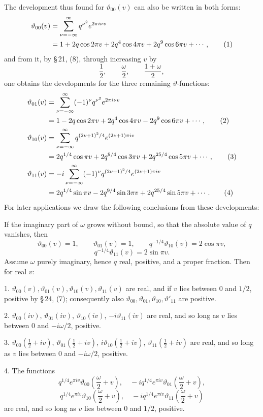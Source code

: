 \documentclass[11pt]{article}
\providecommand{\tht}{\vartheta}
\begin{document}
The development thus found for $\tht_{00}(v)$ can also be written in both forms:
\begin{align}
\tht_{00}(v)&=\sum_{\nu=-\infty}^{\infty}q^{\nu^2}e^{2\pi i\nu v} \notag\\
&=1+2q\cos2\pi v+2q^4\cos4\pi v+2q^9\cos6\pi v+\cdots, \tag{1}
\end{align}
and from it, by \S\,21, (8), through increasing $v$ by
\[
\frac12,\qquad \frac\omega2,\qquad \frac{1+\omega}{2},
\]
one obtains the developments for the three remaining $\vartheta$-functions:
\begin{align}
\tht_{01}(v)&=\sum_{\nu=-\infty}^{\infty}(-1)^\nu q^{\nu^2}e^{2\pi i\nu v} \notag\\
&=1-2q\cos2\pi v+2q^4\cos4\pi v-2q^9\cos6\pi v+\cdots, \tag{2}\\
\tht_{10}(v)&=\sum_{\nu=-\infty}^{\infty}q^{(2\nu+1)^2/4}e^{(2\nu+1)\pi iv} \notag\\
&=2q^{1/4}\cos\pi v+2q^{9/4}\cos3\pi v+2q^{25/4}\cos5\pi v+\cdots, \tag{3}\\
\tht_{11}(v)&=-i\sum_{\nu=-\infty}^{\infty}(-1)^\nu q^{(2\nu+1)^2/4}e^{(2\nu+1)\pi iv} \notag\\
&=2q^{1/4}\sin\pi v-2q^{9/4}\sin3\pi v+2q^{25/4}\sin5\pi v+\cdots. \tag{4}
\end{align}
For later applications we draw the following conclusions from these developments:

If the imaginary part of $\omega$ grows without bound, so that the absolute value of $q$ vanishes, then
\[
\tht_{00}(v)=1,\qquad \tht_{01}(v)=1,\qquad q^{-1/4}\tht_{10}(v)=2\cos\pi v,
\]
\[
q^{-1/4}\tht_{11}(v)=2\sin\pi v.
\]
Assume $\omega$ purely imaginary, hence $q$ real, positive, and a proper fraction. Then for real $v$:

1. $\tht_{00}(v),\tht_{01}(v),\tht_{10}(v),\tht_{11}(v)$ are real, and if $v$ lies between $0$ and $1/2$, positive by \S\,24, (7); consequently also $\tht_{00},\tht_{01},\tht_{10},\tht'_{11}$ are positive.

2. $\tht_{00}(iv)$, $\tht_{01}(iv)$, $\tht_{10}(iv)$, $-i\tht_{11}(iv)$ are real, and so long as $v$ lies between $0$ and $-i\omega/2$, positive.

3. $\tht_{00}(\frac12+iv)$, $\tht_{01}(\frac12+iv)$, $i\tht_{10}(\frac12+iv)$, $\tht_{11}(\frac12+iv)$ are real, and so long as $v$ lies between $0$ and $-i\omega/2$, positive.

4. The functions
\[
q^{1/4}e^{\pi iv}\tht_{00}\left(\frac\omega2+v\right),\quad
-iq^{1/4}e^{\pi iv}\tht_{01}\left(\frac\omega2+v\right),
\]
\[
q^{1/4}e^{\pi iv}\tht_{10}\left(\frac\omega2+v\right),\quad
-iq^{1/4}e^{\pi iv}\tht_{11}\left(\frac\omega2+v\right)
\]
are real, and so long as $v$ lies between $0$ and $1/2$, positive.
\end{document}
